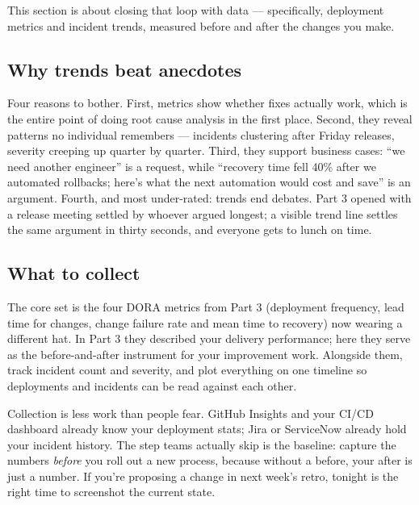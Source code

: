 This section is about closing that loop with data — specifically, deployment metrics and incident trends, measured before and after the changes you make.



\subsection{Why trends beat anecdotes}


Four reasons to bother. First, metrics show whether fixes actually work, which is the entire point of doing root cause analysis in the first place. Second, they reveal patterns no individual remembers — incidents clustering after Friday releases, severity creeping up quarter by quarter. Third, they support business cases: ``we need another engineer'' is a request, while ``recovery time fell 40\% after we automated rollbacks; here's what the next automation would cost and save'' is an argument. Fourth, and most under-rated: trends end debates. Part 3 opened with a release meeting settled by whoever argued longest; a visible trend line settles the same argument in thirty seconds, and everyone gets to lunch on time.



\subsection{What to collect}


The core set is the four DORA metrics from Part 3 (deployment frequency, lead time for changes, change failure rate and mean time to recovery) now wearing a different hat. In Part 3 they described your delivery performance; here they serve as the before-and-after instrument for your improvement work. Alongside them, track incident count and severity, and plot everything on one timeline so deployments and incidents can be read against each other.


Collection is less work than people fear. GitHub Insights and your CI/CD dashboard already know your deployment stats; Jira or ServiceNow already hold your incident history. The step teams actually skip is the baseline: capture the numbers \emph{before} you roll out a new process, because without a before, your after is just a number. If you're proposing a change in next week's retro, tonight is the right time to screenshot the current state.


